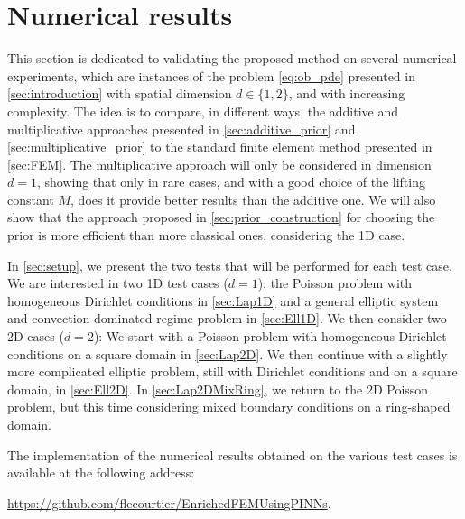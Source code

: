 \section{Numerical results}\label{sec:numerical_results}

This section is dedicated to validating the proposed method on several numerical experiments, which are instances of the problem \eqref{eq:ob_pde} presented in \cref{sec:introduction} with spatial dimension $d \in \{1,2\}$, and with increasing complexity.
The idea is to compare, in different ways, the additive and multiplicative approaches presented in \cref{sec:additive_prior} and \cref{sec:multiplicative_prior} to the standard finite element method presented in \cref{sec:FEM}.
The multiplicative approach will only be considered in dimension $d=1$, showing that only in rare cases, and with a good choice of the lifting constant $M$, does it provide better results than the additive one.
We will also show that the approach proposed in \cref{sec:prior_construction} for choosing the prior is more efficient than more classical ones, considering the 1D case.

In \cref{sec:setup}, we present the two tests that will be performed for each test case. We are interested in two 1D test cases ($d=1$): the Poisson problem with homogeneous Dirichlet conditions in \cref{sec:Lap1D} and a general elliptic system and convection-dominated regime problem in \cref{sec:Ell1D}. We then consider two 2D cases ($d=2$): We start with a Poisson problem with homogeneous Dirichlet conditions on a square domain in \cref{sec:Lap2D}. We then continue with a slightly more complicated elliptic problem, still with Dirichlet conditions and on a square domain, in \cref{sec:Ell2D}. In \cref{sec:Lap2DMixRing}, we return to the 2D Poisson problem, but this time considering mixed boundary conditions on a ring-shaped domain.



The implementation of the numerical results obtained on the various test cases is available at the following address:


\begin{center}
\url{https://github.com/flecourtier/EnrichedFEMUsingPINNs}.
\end{center}













